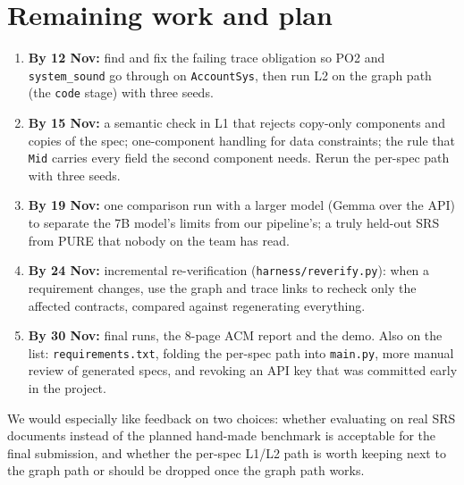 \documentclass[10pt,a4paper]{article}
\newcommand{\code}[1]{\texttt{\small #1}}
\begin{document}
\section{Remaining work and plan}
\begin{enumerate}
\item \textbf{By 12 Nov:} find and fix the failing trace obligation so PO2 and \code{system\_sound} go through on \code{AccountSys}, then run L2 on the graph path (the \code{code} stage) with three seeds.
\item \textbf{By 15 Nov:} a semantic check in L1 that rejects copy-only components and copies of the spec; one-component handling for data constraints; the rule that \code{Mid} carries every field the second component needs. Rerun the per-spec path with three seeds.
\item \textbf{By 19 Nov:} one comparison run with a larger model (Gemma over the API) to separate the 7B model's limits from our pipeline's; a truly held-out SRS from PURE that nobody on the team has read.
\item \textbf{By 24 Nov:} incremental re-verification (\code{harness/reverify.py}): when a requirement changes, use the graph and trace links to recheck only the affected contracts, compared against regenerating everything.
\item \textbf{By 30 Nov:} final runs, the 8-page ACM report and the demo. Also on the list: \code{requirements.txt}, folding the per-spec path into \code{main.py}, more manual review of generated specs, and revoking an API key that was committed early in the project.
\end{enumerate}
We would especially like feedback on two choices: whether evaluating on real SRS documents instead of the planned hand-made benchmark is acceptable for the final submission, and whether the per-spec L1/L2 path is worth keeping next to the graph path or should be dropped once the graph path works.
\end{document}
